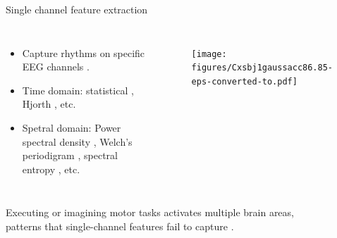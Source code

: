 \documentclass[aspectratio=169]{beamer}
\let\oldcite\cite %
\renewcommand{\cite}[1]{{\tiny\oldcite{#1}}}
\begin{document}
\begin{frame}{Single channel feature extraction}
    \begin{columns}
            \begin{itemize}
                \item Capture rhythms on specific EEG channels \cite{samuel2017towards}.
                \item Time domain: statistical \cite{hamedi2014neural}, Hjorth \cite{yilmaz2018quasi}, etc.
                \item Spetral domain: Power spectral density \cite{oikonomou2017comparison}, Welch's periodigram \cite{roy2022comparative}, spectral entropy \cite{sarraf2017eeg}, etc.
            \end{itemize}
            \begin{figure}[!ht]
                \centering
                \texttt{[image: figures/Cxsbj1gaussacc86.85-eps-converted-to.pdf]}
            \end{figure}
    \end{columns}
    \vspace{3em}
    \centering
    Executing or imagining motor tasks activates multiple brain areas,\\patterns that single-channel features fail to capture \cite{chiarion2023connectivity}.
\end{frame}
\end{document}
